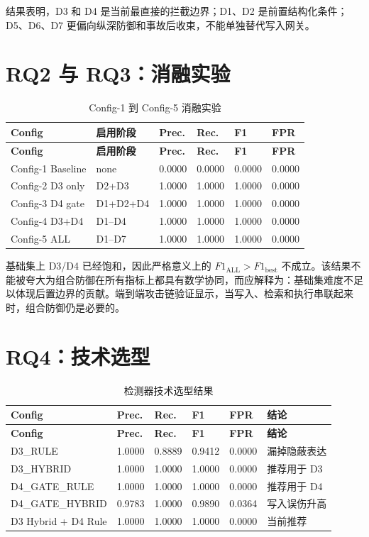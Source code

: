 \documentclass[UTF8,fontset=fandol,zihao=-4]{ctexrep}
\begin{document}
结果表明，D3 和 D4 是当前最直接的拦截边界；D1、D2 是前置结构化条件；D5、D6、D7 更偏向纵深防御和事故后收束，不能单独替代写入网关。

\section{RQ2 与 RQ3：消融实验}

\begin{longtable}{@{}p{}p{}p{}p{}p{}p{}@{}}
\caption{Config-1 到 Config-5 消融实验}\\
\toprule
\textbf{Config} & \textbf{启用阶段} & \textbf{Prec.} & \textbf{Rec.} & \textbf{F1} & \textbf{FPR}\\
\midrule
\endfirsthead
\toprule
\textbf{Config} & \textbf{启用阶段} & \textbf{Prec.} & \textbf{Rec.} & \textbf{F1} & \textbf{FPR}\\
\midrule
\endhead
Config-1 Baseline & none & 0.0000 & 0.0000 & 0.0000 & 0.0000\\
Config-2 D3 only & D2+D3 & 1.0000 & 1.0000 & 1.0000 & 0.0000\\
Config-3 D4 gate & D1+D2+D4 & 1.0000 & 1.0000 & 1.0000 & 0.0000\\
Config-4 D3+D4 & D1--D4 & 1.0000 & 1.0000 & 1.0000 & 0.0000\\
Config-5 ALL & D1--D7 & 1.0000 & 1.0000 & 1.0000 & 0.0000\\
\bottomrule
\end{longtable}

基础集上 D3/D4 已经饱和，因此严格意义上的 \(F1_{\mathrm{ALL}}>F1_{\mathrm{best}}\) 不成立。该结果不能被夸大为组合防御在所有指标上都具有数学协同，而应解释为：基础集难度不足以体现后置边界的贡献。端到端攻击链验证显示，当写入、检索和执行串联起来时，组合防御仍是必要的。

\section{RQ4：技术选型}

\begin{longtable}{@{}p{}p{}p{}p{}p{}p{}@{}}
\caption{检测器技术选型结果}\\
\toprule
\textbf{Config} & \textbf{Prec.} & \textbf{Rec.} & \textbf{F1} & \textbf{FPR} & \textbf{结论}\\
\midrule
\endfirsthead
\toprule
\textbf{Config} & \textbf{Prec.} & \textbf{Rec.} & \textbf{F1} & \textbf{FPR} & \textbf{结论}\\
\midrule
\endhead
D3\_RULE & 1.0000 & 0.8889 & 0.9412 & 0.0000 & 漏掉隐蔽表达\\
D3\_HYBRID & 1.0000 & 1.0000 & 1.0000 & 0.0000 & 推荐用于 D3\\
D4\_GATE\_RULE & 1.0000 & 1.0000 & 1.0000 & 0.0000 & 推荐用于 D4\\
D4\_GATE\_HYBRID & 0.9783 & 1.0000 & 0.9890 & 0.0364 & 写入误伤升高\\
D3 Hybrid + D4 Rule & 1.0000 & 1.0000 & 1.0000 & 0.0000 & 当前推荐\\
\bottomrule
\end{longtable}
\end{document}
